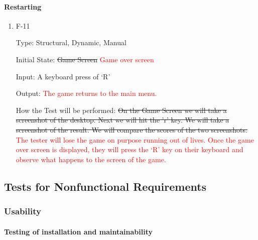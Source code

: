 \documentclass[12pt, titlepage]{article}
\begin{document}
\paragraph{Restarting}

\begin{enumerate}

\item{F-11\\}

Type: Structural, Dynamic, Manual

Initial State: \sout{Game Screen} \textcolor{red}{Game over screen}

Input: A keyboard press of `R' 

Output: \textcolor{red}{The game returns to the main menu.}

How the Test will be performed: \sout{On the Game Screen we will take a screenshot of the desktop. Next we will hit the 'r' key. We will take a screenshot of the result. We will compare the scores of the two screenshots.} \textcolor{red}{The tester will lose the game on purpose running out of lives. Once the game over screen is displayed, they will press the `R' key on their keyboard and observe what happens to the screen of the game.}

\end{enumerate}

\newpage

\subsection{Tests for Nonfunctional Requirements}

\subsubsection{Usability}
        
\paragraph{Testing of installation and maintainability}
\end{document}
